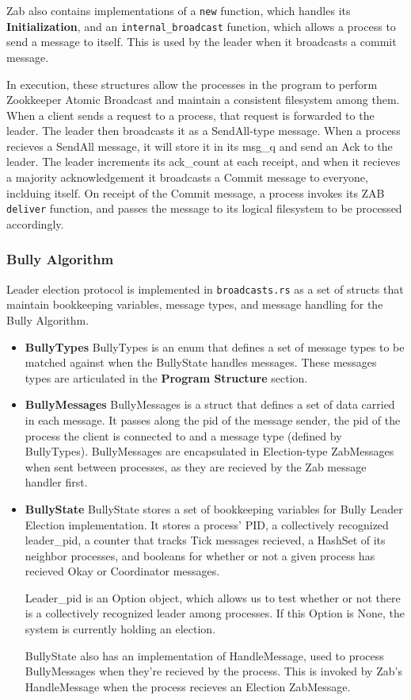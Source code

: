 \documentclass{article}
\begin{document}
    Zab also contains implementations of a \verb|new| function, which handles its \textbf{Initialization}, and an \verb|internal_broadcast| function, which allows a process to send a message to itself. This is used by the leader when it broadcasts a commit message.

    In execution, these structures allow the processes in the program to perform Zookkeeper Atomic Broadcast and maintain a consistent filesystem among them. When a client sends a request to a process, that request is forwarded to the leader. The leader then broadcasts it as a SendAll-type message. When a process recieves a SendAll message, it will store it in its msg_q and send an Ack to the leader. The leader increments its ack_count at each receipt, and when it recieves a majority acknowledgement it broadcasts a Commit message to everyone, inclduing itself. On receipt of the Commit message, a process invokes its ZAB \verb|deliver| function, and passes the message to its logical filesystem to be processed accordingly. 

    \subsubsection*{Bully Algorithm}
    Leader election protocol is implemented in \verb|broadcasts.rs| as a set of structs that maintain bookkeeping variables, message types, and message handling for the Bully Algorithm.

	\begin{itemize}
	    \item\textbf{BullyTypes}
	    BullyTypes is an enum that defines a set of message types to be matched against when the BullyState handles messages. These messages types are articulated in the \textbf{Program Structure} section. 
	    \item\textbf{BullyMessages}
	    BullyMessages is a struct that defines a set of data carried in each message. It passes along the pid of the message sender, the pid of the process the client is connected to and a message type (defined by BullyTypes). BullyMessages are encapsulated in Election-type ZabMessages when sent between processes, as they are recieved by the Zab message handler first. 
	    \item\textbf{BullyState}
	    BullyState stores a set of bookkeeping variables for Bully Leader Election implementation. It stores a process' PID, a collectively recognized leader_pid, a counter that tracks Tick messages recieved, a HashSet of its neighbor processes, and booleans for whether or not a given process has recieved Okay or Coordinator messages. 

	    Leader_pid is an Option object, which allows us to test whether or not there is a collectively recognized leader among processes. If this Option is None, the system is currently holding an election.

		BullyState also has an implementation of HandleMessage, used to process BullyMessages when they're recieved by the process. This is invoked by Zab's HandleMessage when the process recieves an Election ZabMessage. 
	\end{itemize}
\end{document}
